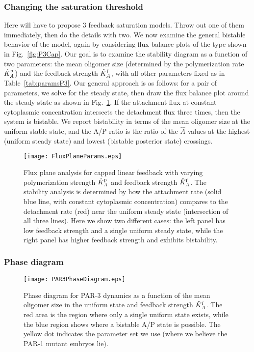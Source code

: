 \documentclass[11pt]{article}
\newcommand{\red}[1]{\color{red}#1\normalcolor}
\newcommand{\6}[1]{#1_{\text{6}}}
\newcommand{\3}[1]{#1_{\text{3}}}
\begin{document}
\subsubsection{Changing the saturation threshold}
\red{Here will have to propose 3 feedback saturation models. Throw out one of them immediately, then do the details with two.} We now examine the general bistable behavior of the model, again by considering flux balance plots of the type shown in Fig.\ \ref{fig:P3Cap}. Our goal is to examine the stability diagram as a function of two parameters: the mean oligomer size (determined by the polymerization rate $\hat{K}^\text{p}_A$) and the feedback strength $\hat{K}^\text{f}_A$, with all other parameters fixed as in Table\ \ref{tab:paramsP3}. Our general approach is as follows: for a pair of parameters, we solve for the steady state, then draw the flux balance plot around the steady state as shown in Fig.\ \ref{fig:P3FluxP}. If the attachment flux at constant cytoplasmic concentration intersects the detachment flux three times, then the system is bistable. We report bistability in terms of the mean oligomer size at the uniform stable state, and the A/P ratio is the ratio of the $\hat A$ values at the highest (uniform steady state) and lowest (bistable posterior state) crossings.

\begin{figure}
\centering
\texttt{[image: FluxPlaneParams.eps]}
\caption{\label{fig:P3FluxP}Flux plane analysis for capped linear feedback with varying polymerization strength $\hat{K}^\text{p}_A$ and feedback strength $\hat{K}^\text{f}_A$. The stability analysis is determined by how the attachment rate (solid blue line, with constant cytoplasmic concentration) compares to the detachment rate (red) near the uniform steady state (intersection of all three lines). Here we show two different cases: the left panel has low feedback strength and a single uniform steady state, while the right panel has higher feedback strength and exhibits bistability. }
\end{figure}

\subsubsection{Phase diagram}

\begin{figure}
\centering
\texttt{[image: PAR3PhaseDiagram.eps]}
\caption{\label{fig:P3PD}Phase diagram for PAR-3 dynamics as a function of the mean oligomer size in the uniform state and feedback strength $\hat{K}^\text{f}_A$. The red area is the region where only a single uniform state exists, while the blue region shows where a bistable A/P state is possible. The yellow dot indicates the parameter set we use (where we believe the PAR-1 mutant embryos lie).}
\end{figure}
\end{document}
